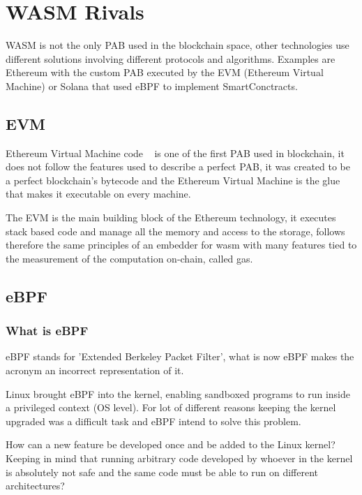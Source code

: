 \documentclass[../main.tex]{subfiles}
\begin{document}
\section{WASM Rivals}

WASM is not the only PAB used in the blockchain space, other technologies use different solutions involving different protocols and algorithms. Examples are Ethereum with the custom PAB executed by the EVM (Ethereum Virtual Machine) or Solana that used eBPF to implement SmartConctracts.

\subsection{EVM}

Ethereum Virtual Machine code ~\cite{buterin2014next} is one of the first PAB used in blockchain, it does not follow the features used to describe a perfect PAB, it was created to be a perfect blockchain's bytecode and the Ethereum Virtual Machine is the glue that makes it executable on every machine.

The EVM is the main building block of the Ethereum technology, it executes stack based code and manage all the memory and access to the storage, follows therefore the same principles of an embedder for wasm with many features tied to the measurement of the computation on-chain, called gas.

\subsection{eBPF}

\subsubsection{What is eBPF}

eBPF stands for 'Extended Berkeley Packet Filter', what is now eBPF makes the acronym an incorrect representation of it.

Linux brought eBPF into the kernel, enabling sandboxed programs to run inside a privileged context (OS level). For lot of different reasons keeping the kernel upgraded was a difficult task and eBPF intend to solve this problem.

How can a new feature be developed once and be added to the Linux kernel? Keeping in mind that running arbitrary code developed by whoever in the kernel is absolutely not safe and the same code must be able to run on different architectures?
\end{document}
